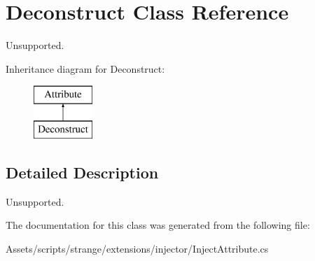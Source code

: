 \hypertarget{class_deconstruct}{\section{Deconstruct Class Reference}
\label{class_deconstruct}
}


Unsupported.  


Inheritance diagram for Deconstruct\-:\begin{figure}[H]
\begin{center}
\leavevmode
\includegraphics[height=2.000000cm]{class_deconstruct}
\end{center}
\end{figure}


\subsection{Detailed Description}
Unsupported. 

The documentation for this class was generated from the following file\-:\begin{DoxyCompactItemize}
\item 
Assets/scripts/strange/extensions/injector/Inject\-Attribute.\-cs\end{DoxyCompactItemize}
